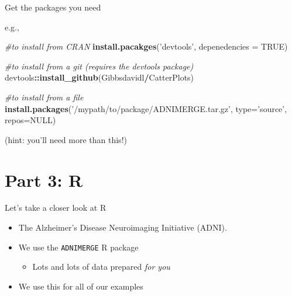 \documentclass[
  ignorenonframetext,
]{beamer}
\newenvironment{Shaded}{\begin{snugshade}}{\end{snugshade}}
\newcommand{\CommentTok}[1]{\textcolor[rgb]{0.56,0.35,0.01}{\textit{#1}}}
\newcommand{\DataTypeTok}[1]{\textcolor[rgb]{0.13,0.29,0.53}{#1}}
\newcommand{\KeywordTok}[1]{\textcolor[rgb]{0.13,0.29,0.53}{\textbf{#1}}}
\newcommand{\NormalTok}[1]{#1}
\newcommand{\OperatorTok}[1]{\textcolor[rgb]{0.81,0.36,0.00}{\textbf{#1}}}
\newcommand{\OtherTok}[1]{\textcolor[rgb]{0.56,0.35,0.01}{#1}}
\newcommand{\StringTok}[1]{\textcolor[rgb]{0.31,0.60,0.02}{#1}}
\providecommand{\tightlist}{%
  \setlength{\itemsep}{0pt}\setlength{\parskip}{0pt}}
\begin{document}
\begin{frame}[fragile]{Get the packages you need}
\protect\hypertarget{get-the-packages-you-need}{}

e.g.,

\begin{Shaded}
\begin{Highlighting}[]
\CommentTok{#to install from CRAN}
\KeywordTok{install.pacakges}\NormalTok{(}\StringTok{'devtools'}\NormalTok{, }\DataTypeTok{depenedencies =} \OtherTok{TRUE}\NormalTok{)}

\CommentTok{#to install from a git  (requires the devtools package)}
\NormalTok{devtools}\OperatorTok{::}\KeywordTok{install_github}\NormalTok{(Gibbsdavidl}\OperatorTok{/}\NormalTok{CatterPlots)}

\CommentTok{#to install from a file}
\KeywordTok{install.packages}\NormalTok{(}\StringTok{'/mypath/to/package/ADNIMERGE.tar.gz'}\NormalTok{, }
                 \DataTypeTok{type=}\StringTok{'source'}\NormalTok{, }\DataTypeTok{repos=}\OtherTok{NULL}\NormalTok{) }
\end{Highlighting}
\end{Shaded}

(hint: you'll need more than this!)

\end{frame}

\hypertarget{part-3-r}{%
\section{Part 3: R}\label{part-3-r}}

\begin{frame}[fragile]{Let's take a closer look at R}
\protect\hypertarget{lets-take-a-closer-look-at-r}{}

\begin{itemize}
\tightlist
\item
  The Alzheimer's Disease Neuroimaging Initiative (ADNI).
\item
  We use the \texttt{ADNIMERGE} R package

  \begin{itemize}
  \tightlist
  \item
    Lots and lots of data prepared \emph{for you}
  \end{itemize}
\item
  We use this for all of our examples
\end{itemize}

\end{frame}
\end{document}
